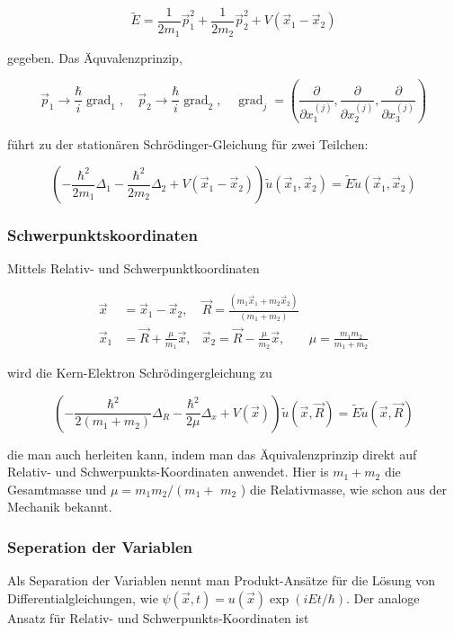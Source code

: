 \documentclass[10pt, letterpaper]{article}
\begin{document}
$$
\tilde{E}=\frac{1}{2 m_{1}} \vec{p}_{1}^{2}+\frac{1}{2 m_{2}} \vec{p}_{2}^{2}+V\left(\vec{x}_{1}-\vec{x}_{2}\right)
$$

gegeben. Das Äquvalenzprinzip,

$$
\vec{p}_{1} \rightarrow \frac{\hbar}{i} \operatorname{grad}_{1}, \quad \vec{p}_{2} \rightarrow \frac{\hbar}{i} \operatorname{grad}_{2}, \quad \operatorname{grad}_{j}=\left(\frac{\partial}{\partial x_{1}^{(j)}}, \frac{\partial}{\partial x_{2}^{(j)}}, \frac{\partial}{\partial x_{3}^{(j)}}\right)
$$

führt zu der stationären Schrödinger-Gleichung für zwei Teilchen:

$$
\left(-\frac{\hbar^{2}}{2 m_{1}} \Delta_{1}-\frac{\hbar^{2}}{2 m_{2}} \Delta_{2}+V\left(\vec{x}_{1}-\vec{x}_{2}\right)\right) \tilde{u}\left(\vec{x}_{1}, \vec{x}_{2}\right)=\tilde{E} \tilde{u}\left(\vec{x}_{1}, \vec{x}_{2}\right)
$$

\subsubsection*{Schwerpunktskoordinaten}
Mittels Relativ- und Schwerpunktkoordinaten

$$
\begin{aligned}
\vec{x} & =\vec{x}_{1}-\vec{x}_{2}, & \vec{R}=\frac{\left(m_{1} \vec{x}_{1}+m_{2} \vec{x}_{2}\right)}{\left(m_{1}+m_{2}\right)} & \\
\vec{x}_{1} & =\vec{R}+\frac{\mu}{m_{1}} \vec{x}, & \vec{x}_{2}=\vec{R}-\frac{\mu}{m_{2}} \vec{x}, & \mu=\frac{m_{1} m_{2}}{m_{1}+m_{2}}
\end{aligned}
$$

wird die Kern-Elektron Schrödingergleichung zu

$$
\left(-\frac{\hbar^{2}}{2\left(m_{1}+m_{2}\right)} \Delta_{R}-\frac{\hbar^{2}}{2 \mu} \Delta_{x}+V(\vec{x})\right) \tilde{u}(\vec{x}, \vec{R})=\tilde{E} \tilde{u}(\vec{x}, \vec{R})
$$

die man auch herleiten kann, indem man das Äquivalenzprinzip direkt auf Relativ- und Schwerpunkts-Koordinaten anwendet. Hier is $m_{1}+m_{2}$ die Gesamtmasse und $\mu=m_{1} m_{2} /\left(m_{1}+\right.$ $m_{2}$ ) die Relativmasse, wie schon aus der Mechanik bekannt.

\subsubsection*{Seperation der Variablen}
Als Separation der Variablen nennt man Produkt-Ansätze für die Lösung von Differentialgleichungen, wie $\psi(\vec{x}, t)=u(\vec{x}) \exp (i E t / \hbar)$. Der analoge Ansatz für Relativ- und Schwerpunkts-Koordinaten ist
\end{document}
